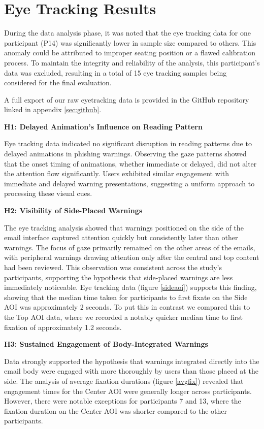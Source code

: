 \documentclass[
  a4paper,  %
  twoside,  %
  bibliography=totoc,
  headsepline,
  cleardoublepage=empty,
  parskip=half,
  draft=false
]{scrbook}
\begin{document}
\section{Eye Tracking Results}
\label{sec:eyetrackingres}
During the data analysis phase, it was noted that the eye tracking data for one participant (P14) was significantly lower in sample size compared to others. This anomaly could be attributed to improper seating position or a flawed calibration process. To maintain the integrity and reliability of the analysis, this participant's data was excluded, resulting in a total of 15 eye tracking samples being considered for the final evaluation.

A full export of our raw eyetracking data is provided in the GitHub repository linked in appendix \ref{sec:github}.


\textbf{H1: Delayed Animation's Influence on Reading Pattern}

Eye tracking data indicated no significant disruption in reading patterns due to delayed animations in phishing warnings. Observing the gaze patterns showed that the onset timing of animations, whether immediate or delayed, did not alter the attention flow significantly. Users exhibited similar engagement with immediate and delayed warning presentations, suggesting a uniform approach to processing these visual cues.

\textbf{H2: Visibility of Side-Placed Warnings} 

The eye tracking analysis showed that warnings positioned on the side of the email interface captured attention quickly but consistently later than other warnings. The focus of gaze primarily remained on the other areas of the emails, with peripheral warnings drawing attention only after the central and top content had been reviewed. This observation was consistent across the study's participants, supporting the hypothesis that side-placed warnings are less immediately noticeable. \newline Eye tracking data (figure \ref{sideaoi}) supports this finding, showing that the median time taken for participants to first fixate on the Side AOI was approximately 2 seconds. To put this in contrast we compared this to the Top AOI data, where we recorded a notably quicker median time to first fixation of approximately 1.2 seconds.  

\textbf{H3: Sustained Engagement of Body-Integrated Warnings}

Data strongly supported the hypothesis that warnings integrated directly into the email body were engaged with more thoroughly by users than those placed at the side. The analysis of average fixation durations (figure \ref{avgfix}) revealed that engagement times for the Center AOI were generally longer across participants. However, there were notable exceptions for participants 7 and 13, where the fixation duration on the Center AOI was shorter compared to the other participants. 
\end{document}
